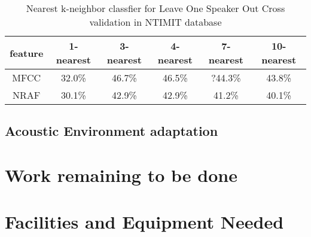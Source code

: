 \documentclass[12pt,letterpaper,doublespaced,ETD,dvips,proposal]{gtthesis}
\begin{document}
\begin{Body}
\begin{table}[htb]
\footnotesize{ \centering
\begin{tabular}{|c|c|c|c|c|c|}
  \hline
  feature & 1-nearest & 3-nearest & 4-nearest & 7-nearest & 10-nearest \\
  \hline
  MFCC & 32.0\% & 46.7\% & 46.5\% & ?44.3\% & 43.8\% \\
  NRAF & 30.1\% & 42.9\% & 42.9\% & 41.2\% & 40.1\% \\
  \hline
\end{tabular}
  \caption{Nearest k-neighbor classfier for Leave One Speaker Out
  Cross validation in  NTIMIT database}
} \label{kneighborLOOCVNTIMIT}
\end{table}

\subsection{Acoustic Environment adaptation}

\section{Work remaining to be done}
\label{remains}

\section{Facilities and Equipment Needed}
\label{facitlies}
\end{Body}

\begin{EndMatter}

\index %
\end{EndMatter}
\end{document}
